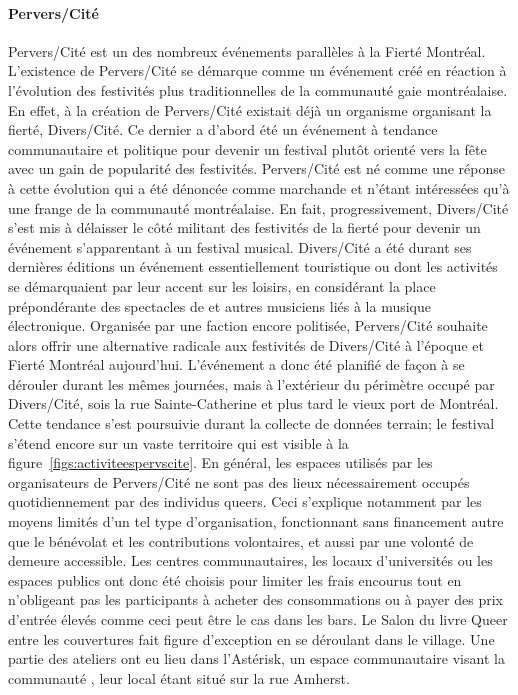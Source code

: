 \paragraph{Pervers/Cité}
\label{subsec:perverscite}

Pervers/Cité est un des nombreux événements parallèles à la Fierté Montréal.
L'existence de Pervers/Cité se démarque comme un événement créé en réaction à l'évolution des festivités plus traditionnelles de la communauté gaie montréalaise.
En effet, à la création de Pervers/Cité existait déjà un organisme organisant la fierté, Divers/Cité.
Ce dernier a d'abord été un événement à tendance communautaire et politique pour devenir un festival plutôt orienté vers la fête avec un gain de popularité des festivités.
Pervers/Cité est né comme une réponse à cette évolution qui a été dénoncée comme marchande et n'étant intéressées qu'à une frange de la communauté \lgbt{} montréalaise.
En fait, progressivement, Divers/Cité s'est mis à délaisser le côté militant des festivités de la fierté pour devenir un événement s'apparentant à un festival musical.
Divers/Cité a été durant ses dernières éditions un événement essentiellement touristique ou dont les activités se démarquaient par leur accent sur les loisirs, en considérant la place prépondérante des spectacles de \dj{} et autres musiciens liés à la musique électronique.
Organisée par une faction encore politisée, Pervers/Cité souhaite alors offrir une alternative radicale aux festivités de Divers/Cité à l'époque et Fierté Montréal aujourd'hui.
L'événement a donc été planifié de façon à se dérouler durant les mêmes journées, mais à l'extérieur du périmètre occupé par Divers/Cité, sois la rue Sainte-Catherine et plus tard le vieux port de Montréal.
Cette tendance s'est poursuivie durant la collecte de données terrain; le festival s'étend encore sur un vaste territoire qui est visible à la figure~\ref{figs:activiteespervscite}.
En général, les espaces utilisés par les organisateurs de Pervers/Cité ne sont pas des lieux nécessairement occupés quotidiennement par des individus queers.
Ceci s'explique notamment par les moyens limités d'un tel type d'organisation, fonctionnant sans financement autre que le bénévolat et les contributions volontaires, et aussi par une volonté de demeure accessible.
Les centres communautaires, les locaux d'universités ou les espaces publics ont donc été choisis pour limiter les frais encourus tout en n’obligeant pas les participants à acheter des consommations ou à payer des prix d'entrée élevés comme ceci peut être le cas dans les bars.
Le Salon du livre Queer entre les couvertures fait figure d'exception en se déroulant dans le village.
Une partie des ateliers ont eu lieu dans l'Astérisk, un espace communautaire visant la communauté \lgbt{}, leur local étant situé sur la rue Amherst.

